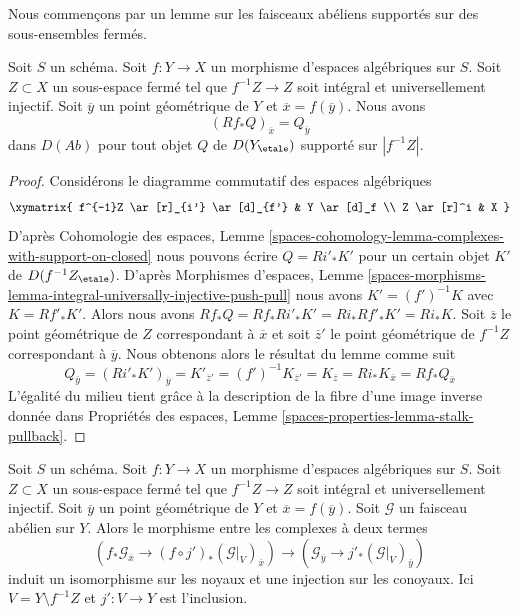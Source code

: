 \medskip\noindent
Nous commençons par un lemme sur les faisceaux abéliens supportés sur des sous-ensembles fermés.

\begin{lemma}
\label{lemma-stalk-pushforward-with-support}
Soit $S$ un schéma. Soit $f : Y \to X$ un morphisme d'espaces algébriques
sur $S$. Soit $Z \subset X$ un sous-espace fermé tel que $f^{-1}Z \to Z$ soit
intégral et universellement injectif. Soit $\overline{y}$ un point géométrique
de $Y$ et $\overline{x} = f(\overline{y})$. Nous avons
$$
(Rf_*Q)_{\overline{x}} = Q_{\overline{y}}
$$
dans $D(\textit{Ab})$ pour tout objet $Q$ de $D(Y_\etale)$ supporté
sur $|f^{-1}Z|$.
\end{lemma}

\begin{proof}
Considérons le diagramme commutatif des espaces algébriques
$$
\xymatrix{
f^{-1}Z \ar[r]_{i'} \ar[d]_{f'} & Y \ar[d]_f \\
Z \ar[r]^i & X
}
$$
D'après Cohomologie des espaces, Lemme
\ref{spaces-cohomology-lemma-complexes-with-support-on-closed} nous pouvons écrire
$Q = Ri'_*K'$ pour un certain objet $K'$ de $D(f^{-1}Z_\etale)$.
D'après Morphismes d'espaces, Lemme
\ref{spaces-morphisms-lemma-integral-universally-injective-push-pull}
nous avons $K' = (f')^{-1}K$ avec $K = Rf'_*K'$.
Alors nous avons $Rf_*Q = Rf_*Ri'_*K' = Ri_*Rf'_*K' = Ri_*K$.
Soit $\overline{z}$ le point géométrique de $Z$ correspondant à $\overline{x}$ et soit $\overline{z}'$ le point géométrique de $f^{-1}Z$ correspondant à $\overline{y}$. Nous obtenons alors le résultat du lemme comme suit
$$
Q_{\overline{y}} = (Ri'_*K')_{\overline{y}} = K'_{\overline{z}'} =
(f')^{-1}K_{\overline{z}'} = K_{\overline{z}} = Ri_*K_{\overline{x}} =
Rf_*Q_{\overline{x}}
$$
L'égalité du milieu tient grâce à la description de la fibre d'une image inverse donnée dans Propriétés des espaces, Lemme \ref{spaces-properties-lemma-stalk-pullback}.
\end{proof}

\begin{lemma}
\label{lemma-stalk-formal-glueing}
Soit $S$ un schéma. Soit $f : Y \to X$ un morphisme d'espaces algébriques sur $S$. Soit $Z \subset X$ un sous-espace fermé tel que $f^{-1}Z \to Z$ soit intégral et universellement injectif. Soit $\overline{y}$ un point géométrique de $Y$ et $\overline{x} = f(\overline{y})$. Soit $\mathcal{G}$ un faisceau abélien sur $Y$. Alors le morphisme entre les complexes à deux termes $$
\left(f_*\mathcal{G}_{\overline{x}} \to
(f \circ j')_*(\mathcal{G}|_V)_{\overline{x}}\right)
\longrightarrow
\left(\mathcal{G}_{\overline{y}} \to j'_*(\mathcal{G}|_V)_{\overline{y}}\right)
$$ induit un isomorphisme sur les noyaux et une injection sur les conoyaux. Ici $V = Y \setminus f^{-1}Z$ et $j' : V \to Y$ est l'inclusion.
\end{lemma}

